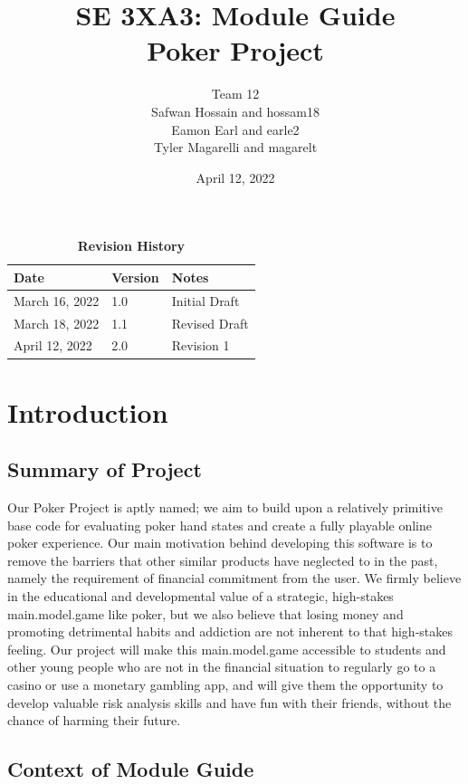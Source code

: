 \documentclass[12pt, titlepage]{article}
\title{SE 3XA3: Module Guide \\Poker Project}
\author{Team 12
        \\ Safwan Hossain and hossam18
        \\ Eamon Earl and earle2
        \\ Tyler Magarelli and magarelt
}
\date{April 12, 2022}
\begin{document}
\maketitle

\tableofcontents
\listoftables
\listoffigures

\begin{table}[bp]
\caption{\bf Revision History}
\begin{tabularx}{\textwidth}{p{3cm}p{2cm}X}
\toprule {\bf Date} & {\bf Version} & {\bf Notes}\\
\midrule
March 16, 2022 & 1.0 & Initial Draft\\
March 18, 2022 & 1.1 & Revised Draft\\
April 12, 2022 & 2.0 & Revision 1\\
\bottomrule
\end{tabularx}
\end{table}

\newpage


\section{Introduction}

\subsection{Summary of Project}

Our Poker Project is aptly named; we aim to build upon a relatively primitive base code for evaluating poker hand states and create a fully playable online poker experience. Our main motivation behind developing this software is to remove the barriers that other similar products have neglected to in the past, namely the requirement of financial commitment from the user. We firmly believe in the educational and developmental value of a strategic, high-stakes main.model.game like poker, but we also believe that losing money and promoting detrimental habits and addiction are not inherent to that high-stakes feeling. Our project will make this main.model.game accessible to students and other young people who are not in the financial situation to regularly go to a casino or use a monetary gambling app, and will give them the opportunity to develop valuable risk analysis skills and have fun with their friends, without the chance of harming their future.

\subsection{Context of Module Guide}
\end{document}
